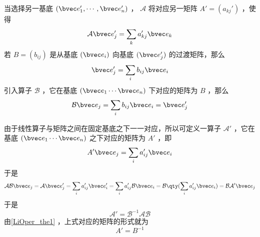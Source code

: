 当选择另一基底 $(\bvec e_1',\cdots,\bvec e_n')$ ， $\mathcal{A}$ 将对应另一矩阵 $A'=(a_{kj}')$ ，使得
\begin{equation}
\mathcal{A}\bvec e_j'=\sum_{k} a'_{kj}\bvec e_k
\end{equation}
若 $B=(b_{ij})$ 是从基底 $(\bvec e_i)$ 向基底 $(\bvec e_j')$ 的过渡矩阵，那么
\begin{equation}
\bvec e_j'=\sum_i b_{ij}\bvec e_i
\end{equation}
引入算子 $\mathcal{B}$ ，它在基底 $(\bvec e_1\cdots \bvec e_n)$ 下对应的矩阵为 $B$ ，那么
\begin{equation}
\mathcal{B}\bvec e_j=\sum_i b_{ij}\bvec e_i=\bvec e_j'
\end{equation}

由于线性算子与矩阵之间在固定基底之下一一对应，所以可定义一算子 $\mathcal{A'}$ ，它在基底 $(\bvec e_1\cdots \bvec e_n)$ 之下对应的矩阵为 $A'$ ，即
\begin{equation}
A'\bvec e_j=\sum_i a'_{ij}\bvec e_i
\end{equation}
于是
\begin{equation}
\mathcal{AB}\bvec e_j=\mathcal{A}\bvec e'_j=\sum_i a'_{ij} \bvec e'_i=\sum_i a'_{ij}\mathcal{B}\bvec e_i=\mathcal{B}\qty(\sum_i a'_{ij}\bvec e_i)=\mathcal{BA'}\bvec e_j
\end{equation}
于是 
\begin{equation}
\mathcal{A'}=\mathcal{B^{-1}AB}
\end{equation}
由\autoref{LiOper_the1} ，上式对应的矩阵的形式就为
\begin{equation}
A'=B^{-1}
\end{equation}

